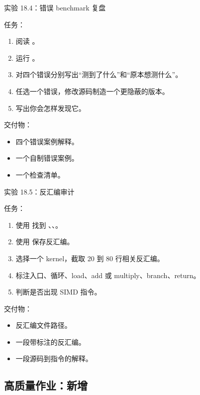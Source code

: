 \begin{labbox}
实验 18.4：错误 benchmark 复盘

任务：

\begin{enumerate}
  \item 阅读 。
  \item 运行 。
  \item 对四个错误分别写出“测到了什么”和“原本想测什么”。
  \item 任选一个错误，修改源码制造一个更隐蔽的版本。
  \item 写出你会怎样发现它。
\end{enumerate}

交付物：

\begin{itemize}
  \item 四个错误案例解释。
  \item 一个自制错误案例。
  \item 一个检查清单。
\end{itemize}
\end{labbox}

\begin{labbox}
实验 18.5：反汇编审计

任务：

\begin{enumerate}
  \item 使用  找到 、、。
  \item 使用  保存反汇编。
  \item 选择一个 kernel，截取 20 到 80 行相关反汇编。
  \item 标注入口、循环、load、add 或 multiply、branch、return。
  \item 判断是否出现 SIMD 指令。
\end{enumerate}

交付物：

\begin{itemize}
  \item 反汇编文件路径。
  \item 一段带标注的反汇编。
  \item 一段源码到指令的解释。
\end{itemize}
\end{labbox}

\subsection{高质量作业：新增 }

